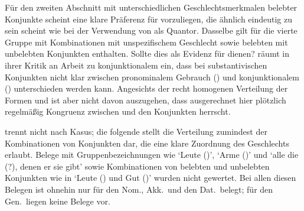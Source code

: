 Für den zweiten Abschnitt mit unterschiedlichen Geschlechtsmerkmalen
belebter Konjunkte scheint eine klare Präferenz für 
vorzuliegen, die ähnlich eindeutig zu sein scheint wie bei der Verwendung von
 als Quantor. Dasselbe gilt für die vierte Gruppe mit Kombinationen
mit unspezifischem Geschlecht sowie belebten mit
unbelebten Konjunkten enthalten. Sollte dies als Evidenz für
 dienen? \citet[187]{gjelsten1980} räumt in ihrer Kritik
an  Arbeit zu konjunktionalem  ein, dass bei
substantivischen Konjunkten nicht klar zwischen pronominalem Gebrauch
() und konjunktionalem
() unterschieden werden kann. Angesichts der
recht homogenen Verteilung der Formen  und  ist aber
nicht davon auszugehen, dass ausgerechnet hier plötzlich regelmäßig Kongruenz
zwischen  und den Konjunkten herrscht.

 trennt nicht nach Kasus; die folgende
 stellt die Verteilung zumindest der
Kombinationen von Konjunkten dar, die eine klare Zuordnung des Geschlechts
erlaubt. Belege mit Gruppenbezeichnungen wie  `Leute (\MascA)',
 `Arme (\MascA)' und  `alle die
(\MascA?), denen er sie gibt' sowie Kombinationen von belebten und
unbelebten Konjunkten wie in  `Leute
(\MascA) und Gut (\NeutI)' wurden nicht gewertet. Bei allen diesen Belegen ist
ohnehin nur  für den Nom., Akk.\ und den Dat.\ belegt; für den
Gen.\ liegen keine Belege vor.

